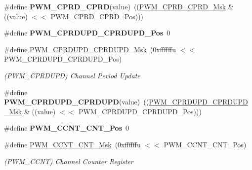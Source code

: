 \begin{DoxyCompactItemize}
\mbox{\label{group__SAMV71__PWM_ga436c7760905f428657aa5b449947a798}} 
\#define {\bfseries P\+W\+M\+\_\+\+C\+P\+R\+D\+\_\+\+C\+P\+RD}(value)~((\mbox{\hyperlink{group__SAMV71__PWM_gae5af6b617a5d5e4da51ade21024e340d}{P\+W\+M\+\_\+\+C\+P\+R\+D\+\_\+\+C\+P\+R\+D\+\_\+\+Msk}} \& ((value) $<$$<$ P\+W\+M\+\_\+\+C\+P\+R\+D\+\_\+\+C\+P\+R\+D\+\_\+\+Pos)))
\item 
\mbox{\label{group__SAMV71__PWM_ga87e884e8c0a0aafbd3a6af1ceea985d7}} 
\#define {\bfseries P\+W\+M\+\_\+\+C\+P\+R\+D\+U\+P\+D\+\_\+\+C\+P\+R\+D\+U\+P\+D\+\_\+\+Pos}~0
\item 
\mbox{\label{group__SAMV71__PWM_ga1fdc0c18ef2194e73b094365eb792fd2}} 
\#define \mbox{\hyperlink{group__SAMV71__PWM_ga1fdc0c18ef2194e73b094365eb792fd2}{P\+W\+M\+\_\+\+C\+P\+R\+D\+U\+P\+D\+\_\+\+C\+P\+R\+D\+U\+P\+D\+\_\+\+Msk}}~(0xffffffu $<$$<$ P\+W\+M\+\_\+\+C\+P\+R\+D\+U\+P\+D\+\_\+\+C\+P\+R\+D\+U\+P\+D\+\_\+\+Pos)
\begin{DoxyCompactList}\small\item\em (P\+W\+M\+\_\+\+C\+P\+R\+D\+U\+PD) Channel Period Update \end{DoxyCompactList}\item 
\mbox{\label{group__SAMV71__PWM_ga3793ebbd314a96f51223948b4e525a12}} 
\#define {\bfseries P\+W\+M\+\_\+\+C\+P\+R\+D\+U\+P\+D\+\_\+\+C\+P\+R\+D\+U\+PD}(value)~((\mbox{\hyperlink{group__SAMV71__PWM_ga1fdc0c18ef2194e73b094365eb792fd2}{P\+W\+M\+\_\+\+C\+P\+R\+D\+U\+P\+D\+\_\+\+C\+P\+R\+D\+U\+P\+D\+\_\+\+Msk}} \& ((value) $<$$<$ P\+W\+M\+\_\+\+C\+P\+R\+D\+U\+P\+D\+\_\+\+C\+P\+R\+D\+U\+P\+D\+\_\+\+Pos)))
\item 
\mbox{\label{group__SAMV71__PWM_gaacf83288cd3d60a64c5f5ca649d90787}} 
\#define {\bfseries P\+W\+M\+\_\+\+C\+C\+N\+T\+\_\+\+C\+N\+T\+\_\+\+Pos}~0
\item 
\mbox{\label{group__SAMV71__PWM_ga50ad77e55d2813cbaa887a2c3c3dac77}} 
\#define \mbox{\hyperlink{group__SAMV71__PWM_ga50ad77e55d2813cbaa887a2c3c3dac77}{P\+W\+M\+\_\+\+C\+C\+N\+T\+\_\+\+C\+N\+T\+\_\+\+Msk}}~(0xffffffu $<$$<$ P\+W\+M\+\_\+\+C\+C\+N\+T\+\_\+\+C\+N\+T\+\_\+\+Pos)
\begin{DoxyCompactList}\small\item\em (P\+W\+M\+\_\+\+C\+C\+NT) Channel Counter Register \end{DoxyCompactList}\item 

\end{DoxyCompactItemize}
